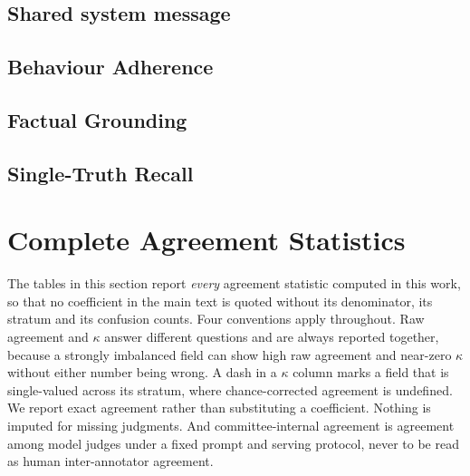 \subsection{Shared system message}

\subsection{Behaviour Adherence}

\subsection{Factual Grounding}

\subsection{Single-Truth Recall}

\FloatBarrier

\section{Complete Agreement Statistics}
\label{app:allagreement}

The tables in this section report \emph{every} agreement statistic computed in
this work, so that no coefficient in the main text is quoted without its
denominator, its stratum and its confusion counts. Four conventions apply
throughout. Raw agreement and $\kappa$ answer different questions and are always
reported together, because a strongly imbalanced field can show high raw
agreement and near-zero $\kappa$ without either number being wrong. A dash in a
$\kappa$ column marks a field that is single-valued across its stratum, where
chance-corrected agreement is undefined. We report exact agreement rather than
substituting a coefficient. Nothing is imputed for missing judgments. And
committee-internal agreement is agreement among model judges under a fixed
prompt and serving protocol, never to be read as human inter-annotator agreement.


